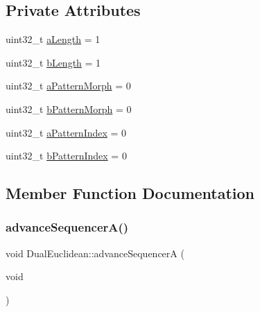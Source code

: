 \subsection*{Private Attributes}
\begin{DoxyCompactItemize}
\item 
uint32\+\_\+t \mbox{\hyperlink{class_dual_euclidean_a8dc9a63effefd7b05cd4a4d4a1672945}{a\+Length}} = 1
\item 
uint32\+\_\+t \mbox{\hyperlink{class_dual_euclidean_ab5d416927c292f4419a2f8054d39943b}{b\+Length}} = 1
\item 
uint32\+\_\+t \mbox{\hyperlink{class_dual_euclidean_abce5f6318b327482af48ce89e3a91b04}{a\+Pattern\+Morph}} = 0
\item 
uint32\+\_\+t \mbox{\hyperlink{class_dual_euclidean_a51b2bc87d191c9b092d2983c5042416b}{b\+Pattern\+Morph}} = 0
\item 
uint32\+\_\+t \mbox{\hyperlink{class_dual_euclidean_a77f16f36c4c5e7b29dd15a10d501fcab}{a\+Pattern\+Index}} = 0
\item 
uint32\+\_\+t \mbox{\hyperlink{class_dual_euclidean_a7a9b06d0d83d1d8eeff1ce41df231b88}{b\+Pattern\+Index}} = 0
\end{DoxyCompactItemize}


\subsection{Member Function Documentation}
\mbox{\label{class_dual_euclidean_adfa104faaaa81723ec6e3ce1f3f70d92}} 
\subsubsection{\texorpdfstring{advance\+Sequencer\+A()}{advanceSequencerA()}}
{\footnotesize\ttfamily void Dual\+Euclidean\+::advance\+SequencerA (\begin{DoxyParamCaption}\item[{void}]{ }\end{DoxyParamCaption})}

\mbox{\label{class_dual_euclidean_a84bd2974dc771fde961db2e81797916f}} 
